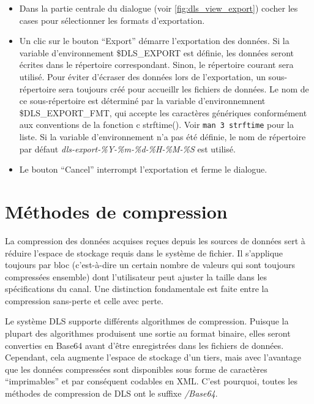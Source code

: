 \documentclass[a4paper,12pt,BCOR6mm,bibtotoc,idxtotoc]{scrbook}
\begin{document}
\begin{itemize}

\item Dans la partie centrale du dialogue (voir \autoref{fig:dls_view_export})
  cocher les cases pour s\'electionner les formats d'exportation.

\item Un clic sur le bouton ``Export'' d\'emarre l'exportation des
  donn\'ees. Si la variable d'environnement
  \$DLS\_EXPORT est d\'efinie, les donn\'ees
  seront \'ecrites dans le r\'epertoire correspondant. Sinon, le
  r\'epertoire courant sera utilis\'e. Pour \'eviter d'\'ecraser des
  donn\'ees lors de l'exportation, un sous-r\'epertoire sera toujours
  cr\'e\'e pour accueillr les fichiers de donn\'ees.  Le nom de ce
  sous-r\'epertoire est d\'etermin\'e par la variable d'environnemnent
  \$DLS\_EXPORT\_FMT, qui accepte les
  caract\`eres g\'en\'eriques conform\'ement aux conventions de la
  fonction c strftime().  Voir \texttt{man 3 strftime} pour la liste.
  Si la variable d'environnement n'a pas \'et\'e d\'efinie, le nom de
  r\'epertoire par d\'efaut
  \textit{dls-export-\%Y-\%m-\%d-\%H-\%M-\%S} est utilis\'e.


\item Le bouton ``Cancel'' interrompt l'exportation et ferme le dialogue.

\end{itemize}


\chapter{M\'ethodes de compression}
\label{sec:comp} 

La compression des donn\'ees acquises re\c cues depuis les sources de
donn\'ees sert \`a r\'eduire l'espace de stockage requis dans le syst\`eme
de fichier. Il s'applique toujours par bloc (c'est-\`a-dire un certain
nombre de valeurs qui sont toujours compressées ensemble)
dont l'utilisateur peut ajuster la taille dans les sp\'ecifications du canal.
Une distinction fondamentale est faite entre la compression sans-perte
et celle avec perte.

Le syst\`eme DLS supporte diff\'erents algorithmes de compression.
Puisque la plupart des algorithmes produisent une sortie au format binaire,
elles seront converties en Base64 avant d'\^etre enregistr\'ees dans les
fichiers de donn\'ees.
Cependant, cela augmente l'espace de stockage d'un tiers, mais avec l'avantage
que les donn\'ees compress\'ees sont disponibles sous forme
de caract\`eres ``imprimables'' et par cons\'equent codables en XML.
C'est pourquoi, toutes les m\'ethodes de compression de DLS ont le suffixe
\textit{/Base64}.
\end{document}
